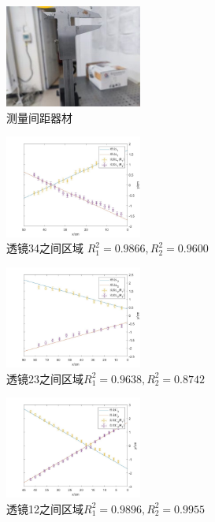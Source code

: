 \documentclass[UTF8]{gapd}
\begin{document}
\begin{figure}[htbp]
  \centering
  \includegraphics[width=0.4\textwidth]{images/23.jpg}
  \caption{测量间距器材}
  \label{fig:23}
\end{figure}
\begin{figure}[htbp]
  \centering
  \includegraphics[width=0.4\textwidth]{images/24.jpg}
  \caption{透镜34之间区域 $R_1^2=0.9866,R_2^2=0.9600$}
\end{figure}
\begin{figure}[htbp]
  \centering
  \includegraphics[width=0.4\textwidth]{images/25.jpg}
  \caption{透镜23之间区域$R_1^2=0.9638,R_2^2=0.8742$}
\end{figure}
\begin{figure}[htbp]
  \centering
  \includegraphics[width=0.4\textwidth]{images/26.jpg}
  \caption{透镜12之间区域$R_1^2=0.9896,R_2^2=0.9955$}
\end{figure}
\end{document}
